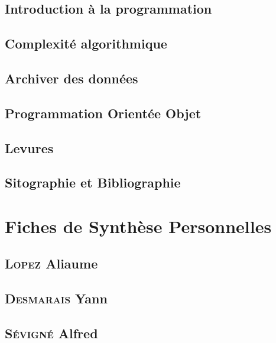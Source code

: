 \documentclass[a4paper,15pt]{report}
\begin{document}
\begin{appendix}

\chapter{Introduction à la programmation}
  
\chapter{Complexité algorithmique}

\chapter{Archiver des données}
	
\chapter{Programmation Orientée Objet}
	
\chapter{Levures}
	

\end{appendix}

\chapter{Sitographie et Bibliographie}
  
  
  
\part*{Fiches de Synthèse Personnelles}
  \chapter*{\textsc{Lopez} Aliaume}
    
  \chapter*{\textsc{Desmarais} Yann}
  \chapter*{\textsc{Sévigné} Alfred}
    
\end{document}
